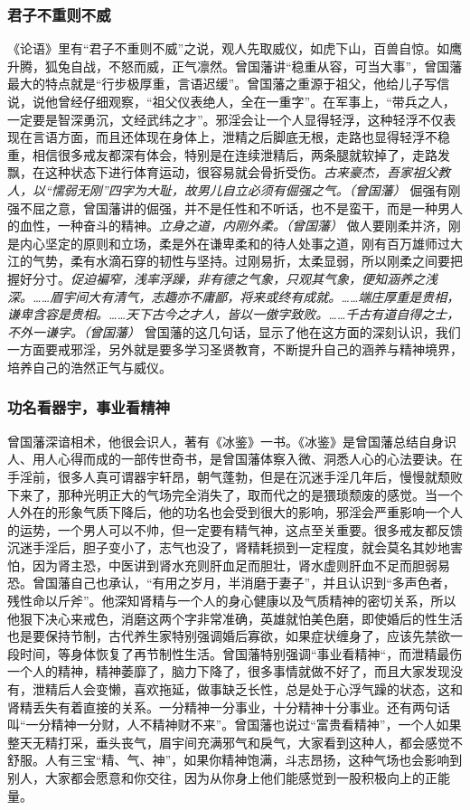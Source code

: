 \subsubsection{君子不重则不威}

《论语》里有“君子不重则不威”之说，观人先取威仪，如虎下山，百兽自惊。如鹰升腾，狐兔自战，不怒而威，正气凛然。曾国藩讲“稳重从容，可当大事”，曾国藩最大的特点就是“行步极厚重，言语迟缓”。曾国藩之重源于祖父，他给儿子写信说，说他曾经仔细观察，“祖父仪表绝人，全在一重字”。在军事上，“带兵之人，一定要是智深勇沉，文经武纬之才”。邪淫会让一个人显得轻浮，这种轻浮不仅表现在言语方面，而且还体现在身体上，泄精之后脚底无根，走路也显得轻浮不稳重，相信很多戒友都深有体会，特别是在连续泄精后，两条腿就软掉了，走路发飘，在这种状态下进行体育运动，很容易就会骨折受伤。\textit{古来豪杰，吾家祖父教人，以“懦弱无刚”四字为大耻，故男儿自立必须有倔强之气。（曾国藩）} 倔强有刚强不屈之意，曾国藩讲的倔强，并不是任性和不听话，也不是蛮干，而是一种男人的血性，一种奋斗的精神。\textit{立身之道，内刚外柔。（曾国藩）} 做人要刚柔并济，刚是内心坚定的原则和立场，柔是外在谦卑柔和的待人处事之道，刚有百万雄师过大江的气势，柔有水滴石穿的韧性与坚持。过刚易折，太柔显弱，所以刚柔之间要把握好分寸。\textit{促迫褊窄，浅率浮躁，非有德之气象，只观其气象，便知涵养之浅深。……眉宇间大有清气，志趣亦不庸鄙，将来或终有成就。……端庄厚重是贵相，谦卑含容是贵相。……天下古今之才人，皆以一傲字致败。……千古有道自得之士，不外一谦字。（曾国藩）} 曾国藩的这几句话，显示了他在这方面的深刻认识，我们一方面要戒邪淫，另外就是要多学习圣贤教育，不断提升自己的涵养与精神境界，培养自己的浩然正气与威仪。

\subsubsection{功名看器宇，事业看精神}

曾国藩深谙相术，他很会识人，著有《冰鉴》一书。《冰鉴》是曾国藩总结自身识人、用人心得而成的一部传世奇书，是曾国藩体察入微、洞悉人心的心法要诀。在手淫前，很多人真可谓器宇轩昂，朝气蓬勃，但是在沉迷手淫几年后，慢慢就颓败下来了，那种光明正大的气场完全消失了，取而代之的是猥琐颓废的感觉。当一个人外在的形象气质下降后，他的功名也会受到很大的影响，邪淫会严重影响一个人的运势，一个男人可以不帅，但一定要有精气神，这点至关重要。很多戒友都反馈沉迷手淫后，胆子变小了，志气也没了，肾精耗损到一定程度，就会莫名其妙地害怕，因为肾主恐，中医讲到肾水充则肝血足而胆壮，肾水虚则肝血不足而胆弱易恐。曾国藩自己也承认，“有用之岁月，半消磨于妻子”，并且认识到“多声色者，残性命以斤斧”。他深知肾精与一个人的身心健康以及气质精神的密切关系，所以他狠下决心来戒色，消磨这两个字非常准确，英雄就怕美色磨，即使婚后的性生活也是要保持节制，古代养生家特别强调婚后寡欲，如果症状缠身了，应该先禁欲一段时间，等身体恢复了再节制性生活。曾国藩特别强调“事业看精神“，而泄精最伤一个人的精神，精神萎靡了，脑力下降了，很多事情就做不好了，而且大家发现没有，泄精后人会变懒，喜欢拖延，做事缺乏长性，总是处于心浮气躁的状态，这和肾精丢失有着直接的关系。一分精神一分事业，十分精神十分事业。还有两句话叫“一分精神一分财，人不精神财不来”。曾国藩也说过“富贵看精神”，一个人如果整天无精打采，垂头丧气，眉宇间充满邪气和戾气，大家看到这种人，都会感觉不舒服。人有三宝“精、气、神”，如果你精神饱满，斗志昂扬，这种气场也会影响到别人，大家都会愿意和你交往，因为从你身上他们能感觉到一股积极向上的正能量。

